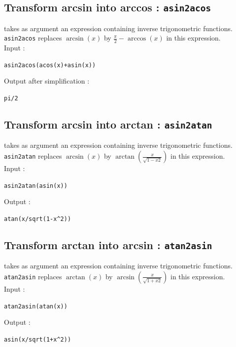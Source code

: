 \documentclass[a4paper,11pt]{book}
\begin{document}
\subsection{Transform arcsin into arccos : {\tt asin2acos}}
 takes as argument an 
expression containing inverse trigonometric functions.\\
{\tt asin2acos} replaces $\arcsin(x)$  by
$\displaystyle \frac{\pi}{2}-\arccos(x)$ in this expression.\\
Input :
\begin{center}{\tt asin2acos(acos(x)+asin(x))}\end{center}
Output after simplification :
\begin{center}{\tt pi/2}\end{center}

\subsection{Transform arcsin into arctan : {\tt asin2atan}}
 takes as argument an expression containing 
inverse trigonometric functions.\\
{\tt asin2atan} replaces $\arcsin(x)$  by 
$\displaystyle \arctan(\frac{x}{\sqrt{1-x2}})$ in this expression.\\
Input :
\begin{center}{\tt asin2atan(asin(x))}\end{center}
Output :
\begin{center}{\tt atan(x/sqrt(1-x\verb|^|2))}\end{center}

\subsection{Transform arctan into arcsin : {\tt atan2asin}}
 takes as argument an expression
containing inverse trigonometric functions.
{\tt atan2asin} replaces $\arctan(x)$ by 
$\displaystyle \arcsin(\frac{x}{\sqrt{1+x2}})$ in this expression.\\
Input :
\begin{center}{\tt atan2asin(atan(x))}\end{center}
Output :
\begin{center}{\tt asin(x/sqrt(1+x\verb|^|2))}\end{center}
\end{document}
